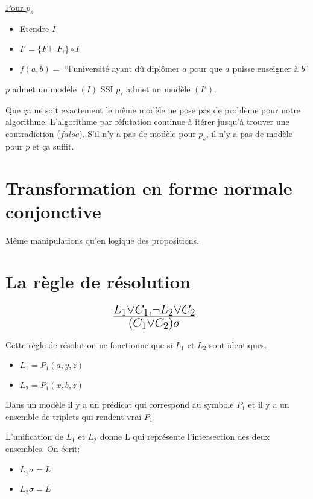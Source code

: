 \vspace{5 mm}

\underline{Pour $p_s$}
\begin{itemize}
  \item Etendre $I$
  \item $I' = \big\{ F \vdash F_i \big\} \circ I$
  \item $f(a,b) = $ ``l'université ayant dû diplômer $a$ pour que $a$ puisse enseigner à $b$''
\end{itemize}

\vspace{5 mm}
$p$ admet un modèle $(I)$ SSI $p_s$ admet un modèle $(I')$.

Que ça ne soit exactement le même modèle ne pose pas de problème pour notre algorithme. L'algorithme par réfutation continue à itérer jusqu'à trouver une contradiction ($false$). S'il n'y a pas de modèle pour $p_s$, il n'y a pas de modèle pour $p$ et ça suffit.

\section{Transformation en forme normale conjonctive}

Même manipulations qu'en logique des propositions.

\section{La règle de résolution}

$$ \mbox{\huge $\frac{L_1 \vee C_1, \neg L_2 \vee C_2}{(C_1 \vee C_2)\sigma}$ } $$

Cette règle de résolution ne fonctionne que si $L_1$ et $L_2$ sont identiques.

\begin{itemize}
  \item $L_1 = P_1(a, y, z)$
  \item $L_2 = P_1(x, b, z)$
\end{itemize}

Dans un modèle il y a un prédicat qui correspond au symbole $P_1$ et il y a un ensemble de triplets qui rendent vrai $P_1$.

L'unification de $L_1$ et $L_2$ donne L qui représente l'intersection des deux ensembles. On écrit:
\begin{itemize}
  \item $L_1 \sigma = L$
  \item $L_2 \sigma = L$
\end{itemize}

